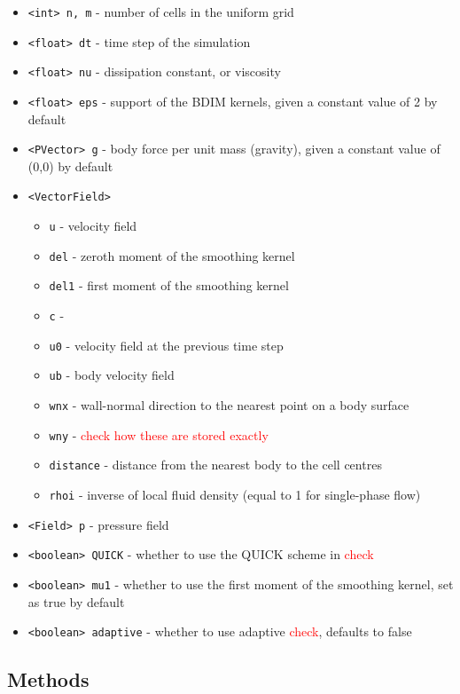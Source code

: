 \documentclass[notitlepage]{article}
\begin{document}
\begin{itemize}
\item \texttt{<int> n, m} - number of cells in the uniform grid
\item \texttt{<float> dt} - time step of the simulation
\item \texttt{<float> nu} - dissipation constant, or viscosity
\item \texttt{<float> eps} - support of the BDIM kernels, given a constant value of 2 by default
\item \texttt{<PVector> g} - body force per unit mass (gravity), given a constant value of (0,0) by default
\item \texttt{<VectorField>}
	\begin{itemize}
	\item \texttt{u} - velocity field
	\item \texttt{del} - zeroth moment of the smoothing kernel
	\item \texttt{del1} - first moment of the smoothing kernel
	\item \texttt{c} - 
	\item \texttt{u0} - velocity field at the previous time step
	\item \texttt{ub} - body velocity field
	\item \texttt{wnx} - wall-normal direction to the nearest point on a body surface
	\item \texttt{wny} - \textcolor{red}{check how these are stored exactly}
	\item \texttt{distance} - distance from the nearest body to the cell centres
	\item \texttt{rhoi} - inverse of local fluid density (equal to 1 for single-phase flow)
	\end{itemize}
\item \texttt{<Field> p} - pressure field
\item \texttt{<boolean> QUICK} - whether to use the QUICK scheme in \textcolor{red}{check}
\item \texttt{<boolean> mu1} - whether to use the first moment of the smoothing kernel, set as true by default
\item \texttt{<boolean> adaptive} - whether to use adaptive \textcolor{red}{check}, defaults to false
\end{itemize}

\subsection{Methods}
\end{document}
